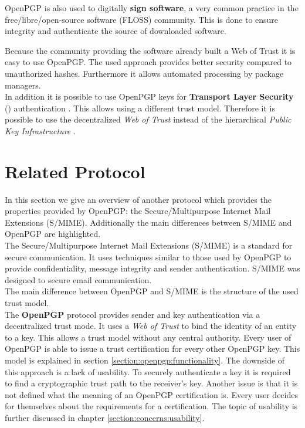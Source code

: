 OpenPGP is also used to digitally \textbf{sign software}, a very common practice in the free/libre/open-source software (FLOSS) community. This is done to ensure integrity and authenticate the source of downloaded software. 

Because the community providing the software already built a Web of Trust it is easy to use OpenPGP. The used approach provides better security compared to unauthorized hashes. Furthermore it allows automated processing by package managers. \\

In addition it is possible to use OpenPGP keys for \textbf{Transport Layer Security} () authentication \cite{RFC6091}. This allows using a different trust model. Therefore it is possible to use the decentralized \textit{Web of Trust} instead of the hierarchical \textit{Public Key Infrastructure} \citep{RFC5280}. 

\section{Related Protocol} \label{section:openpgp:smime}

In this section we give an overview of another protocol which provides the properties provided by OpenPGP: the Secure/Multipurpose Internet Mail Extensions (S/MIME). Additionally the main differences between S/MIME and OpenPGP are highlighted. \\

The Secure/Multipurpose Internet Mail Extensions (S/MIME) \citep{RFC5751} is a standard for secure communication. It uses techniques similar to those used by OpenPGP to provide confidentiality, message integrity and sender authentication. S/MIME was designed to secure email communication.  \\

The main difference between OpenPGP and S/MIME is the structure of the used trust model.  \\

The \textbf{OpenPGP} protocol provides sender and key authentication via a decentralized trust mode. It uses a \textit{Web of Trust} to bind the identity of an entity to a key. This allows a trust model without any central authority. Every user of OpenPGP is able to issue a trust certification for every other OpenPGP key. This model is explained in section \ref{section:openpgp:functionality}. The downside of this approach is a lack of usability. To securely authenticate a key it is required to find a cryptographic trust path to the receiver's key. Another issue is that it is not defined what the meaning of an OpenPGP certification is. Every user decides for themselves about the requirements for a certification. The topic of usability is further discussed in chapter \ref{section:concerns:usability}. \\

